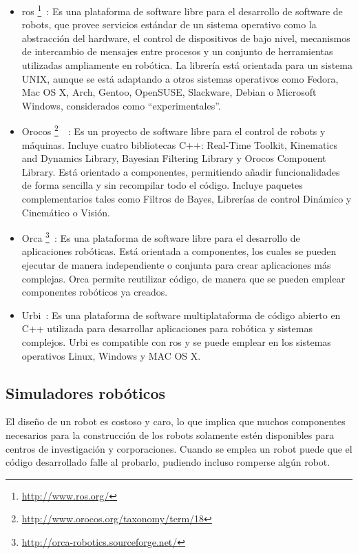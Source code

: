 \begin{itemize}
\item \acrfull{ros} \footnote{\url{http://www.ros.org/}}~\cite{middleware1}: Es una plataforma de software libre para el desarrollo de software de robots, que provee servicios estándar de un sistema operativo como la abstracción del hardware, el control de dispositivos de bajo nivel, mecanismos de intercambio de mensajes entre procesos y un conjunto de herramientas utilizadas ampliamente en robótica. La librería está orientada para un sistema UNIX, aunque se está adaptando a otros sistemas operativos como Fedora, Mac OS X, Arch, Gentoo, OpenSUSE, Slackware, Debian o Microsoft Windows, considerados como ``experimentales''.
\item Orocos \footnote{\url{http://www.orocos.org/taxonomy/term/18}}~\cite{orocos}~\cite{orocos1}: Es un proyecto de software libre para el control de robots y máquinas. Incluye cuatro bibliotecas C++: Real-Time Toolkit, Kinematics and Dynamics Library,  Bayesian Filtering Library y  Orocos Component Library. Está orientado a componentes, permitiendo añadir funcionalidades de forma sencilla y sin recompilar todo el código.  Incluye paquetes complementarios tales como Filtros de Bayes, Librerías de control Dinámico y Cinemático o Visión.
\item Orca \footnote{\url{http://orca-robotics.sourceforge.net/}}~\cite{middleware1}: Es una plataforma de software libre para el desarrollo de aplicaciones robóticas. Está orientada a componentes, los cuales se pueden ejecutar de manera independiente o conjunta para crear aplicaciones más complejas. Orca permite reutilizar código, de manera que se pueden emplear componentes robóticos ya creados.
\item Urbi~\cite{urbi}: Es una plataforma de software multiplataforma de código abierto en C++ utilizada para desarrollar aplicaciones para robótica y sistemas complejos. Urbi es compatible con \acrshort{ros} y se puede emplear en los sistemas operativos Linux, Windows y MAC OS X.
\end{itemize}

\subsection{Simuladores robóticos}
El diseño de un robot es costoso y caro, lo que implica que muchos componentes necesarios para la construcción de los robots solamente estén disponibles para centros de investigación y corporaciones. Cuando se emplea un robot puede que el código desarrollado falle al probarlo, pudiendo incluso romperse algún robot.\\

